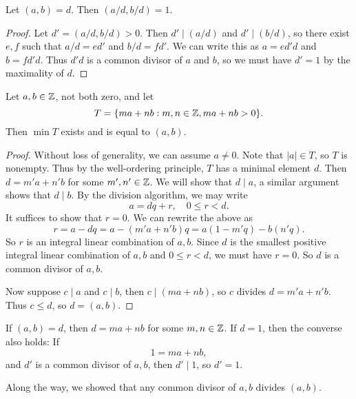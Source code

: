\begin{prop}
  Let $(a, b) = d$. Then
  $(a / d, b / d) = 1$.
\end{prop}

\begin{proof}
  Let $d' = (a / d, b / d) > 0$. Then
  $d' \mid (a / d)$ and $d' \mid (b / d)$,
  so there exist $e, f$ such that
  $a / d = ed'$ and $b / d = fd'$.
  We can write this as $a = e d' d$ and
  $b = f d' d$. Thus
  $d' d$ is a common divisor of
  $a$ and $b$, so
  we must have $d' = 1$ by the maximality
  of $d$.
\end{proof}

\begin{prop}
  Let $a, b \in \mathbb{Z}$, not both zero,
and let \[T = \{ma + nb : m, n \in \mathbb{Z}, ma + nb > 0\}.\] Then
  $\min T$ exists and is equal to
  $(a, b)$.
\end{prop}

\begin{proof}
  Without loss of generality, we can
  assume $a \ne 0$. Note that
  $|a| \in T$, so $T$ is nonempty. Thus
  by the well-ordering principle, $T$
  has a minimal element $d$.
  Then $d = m' a + n' b$ for some
  $m', n' \in \mathbb{Z}$. We will show that
  $d \mid a$, a similar argument
  shows that $d \mid b$. By the
  division algorithm, we may write
  \[
    a = dq + r, \quad 0 \le r < d.
  \]
  It suffices to show that $r = 0$.
  We can rewrite the above as
  \[
    r
    = a - dq
    = a - (m' a + n' b)q
    = a(1 - m' q) - b(n' q).
  \]
  So $r$ is an integral linear combination
  of $a, b$. Since
  $d$ is the smallest positive
  integral linear combination of
  $a, b$ and $0 \le r < d$, we must
  have $r = 0$.
  So $d$ is a common divisor of $a, b$.

  Now suppose $c \mid a$ and $c \mid b$,
  then $c \mid (ma + nb)$, so
  $c$ divides $d = m' a + n' b$.
  Thus $c \le d$, so $d = (a, b)$.
\end{proof}

\begin{remark}
  If $(a, b) = d$, then $d = ma + nb$
  for some $m, n \in \mathbb{Z}$. If $d = 1$, then
  the converse also holds: If
  \[
    1 = ma + nb,
  \]
  and $d'$ is a common divisor of $a, b$,
  then $d' \mid 1$, so $d' = 1$.
\end{remark}

\begin{remark}
  Along the way, we showed that any
  common divisor of $a, b$ divides
  $(a, b)$.
\end{remark}

